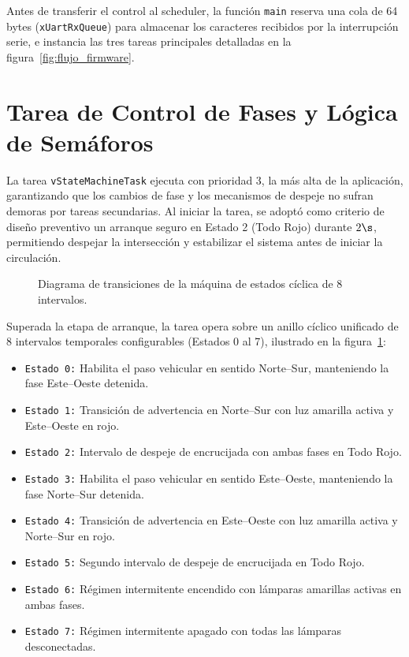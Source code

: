 Antes de transferir el control al scheduler, la función \texttt{main} reserva una cola de 64 bytes
(\texttt{xUartRxQueue}) para almacenar los caracteres recibidos por la interrupción serie, e instancia las tres tareas
principales detalladas en la figura~\ref{fig:flujo_firmware}.

\section{Tarea de Control de Fases y Lógica de Semáforos}
\label{sec:fsm_task}

La tarea \texttt{vStateMachineTask} ejecuta con prioridad 3, la más alta de la aplicación, garantizando que los
cambios de fase y los mecanismos de despeje no sufran demoras por tareas secundarias. Al iniciar la tarea, se adoptó
como criterio de diseño preventivo un arranque seguro en Estado 2 (Todo Rojo) durante $2\s$, permitiendo despejar
la intersección y estabilizar el sistema antes de iniciar la circulación.

\begin{figure}[!ht]
  \centering
  \resizebox{\textwidth}{!}{}
  \caption{Diagrama de transiciones de la máquina de estados cíclica de 8 intervalos.}
  \label{fig:fsm_semaforo}
\end{figure}

Superada la etapa de arranque, la tarea opera sobre un anillo cíclico unificado de 8 intervalos temporales
configurables (Estados 0 al 7), ilustrado en la figura~\ref{fig:fsm_semaforo}:
\begin{itemize}
  \item \texttt{Estado 0:} Habilita el paso vehicular en sentido Norte--Sur, manteniendo la fase Este--Oeste detenida.
  \item \texttt{Estado 1:} Transición de advertencia en Norte--Sur con luz amarilla activa y Este--Oeste
    en rojo.
  \item \texttt{Estado 2:} Intervalo de despeje de encrucijada con ambas fases en Todo Rojo.
  \item \texttt{Estado 3:} Habilita el paso vehicular en sentido Este--Oeste, manteniendo la fase Norte--Sur detenida.
  \item \texttt{Estado 4:} Transición de advertencia en Este--Oeste con luz amarilla activa y Norte--Sur
    en rojo.
  \item \texttt{Estado 5:} Segundo intervalo de despeje de encrucijada en Todo Rojo.
  \item \texttt{Estado 6:} Régimen intermitente encendido con lámparas amarillas activas en ambas fases.
  \item \texttt{Estado 7:} Régimen intermitente apagado con todas las lámparas desconectadas.
\end{itemize}

